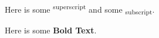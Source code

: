 Here is some \textsuperscript{superscript} and some \textsubscript{subscript}.

Here is some \textbf{Bold Text}.